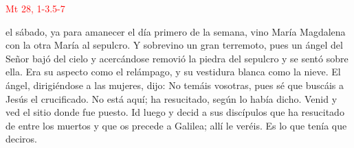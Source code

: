 \hfill\textcolor{red}{Mt 28, 1-3.5-7}

el sábado, ya para amanecer el día primero de la semana, vino María Magdalena con la otra María al sepulcro. Y sobrevino un gran terremoto,
pues un ángel del Señor bajó del cielo y acercándose removió la piedra del sepulcro y se sentó sobre ella. Era su aspecto como el relámpago, y su vestidura blanca como la nieve.
El ángel, dirigiéndose a las mujeres, dijo: No temáis vosotras, pues sé que buscáis a Jesús el crucificado. No está aquí; ha resucitado, según lo había dicho.
Venid y ved el sitio donde fue puesto. Id luego y decid a sus discípulos que ha resucitado de entre los muertos y que os precede a Galilea; allí le veréis.
Es lo que tenía que deciros. 